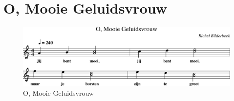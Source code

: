\section{O, Mooie Geluidsvrouw}



\begin{figure}[!htbp]
  \includegraphics[width=\textwidth,height=\textheight,keepaspectratio]{../songs/12_o_mooie_geluidsvrouw.png}
  \caption{O, Mooie Geluidsvrouw}
  \label{fig:12_o_mooie_geluidsvrouw}
\end{figure}
